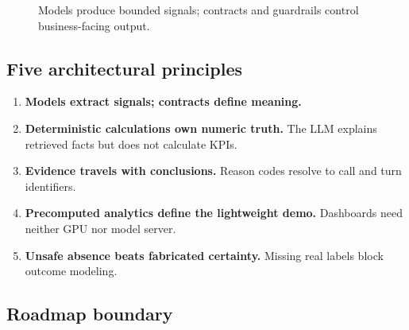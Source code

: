 \documentclass[11pt,letterpaper]{article}
\newenvironment{compactenum}{\begin{enumerate}\setlength{\itemsep}{2pt}\setlength{\parskip}{0pt}\setlength{\topsep}{3pt}}{\end{enumerate}}
\begin{document}
\begin{figure}[ht]
\centering
{}
\caption{Models produce bounded signals; contracts and guardrails control business-facing output.}
\end{figure}

\subsection{Five architectural principles}

\begin{compactenum}
  \item \textbf{Models extract signals; contracts define meaning.}
  \item \textbf{Deterministic calculations own numeric truth.} The LLM explains
  retrieved facts but does not calculate KPIs.
  \item \textbf{Evidence travels with conclusions.} Reason codes resolve to call and
  turn identifiers.
  \item \textbf{Precomputed analytics define the lightweight demo.} Dashboards need
  neither GPU nor model server.
  \item \textbf{Unsafe absence beats fabricated certainty.} Missing real labels block
  outcome modeling.
\end{compactenum}

\subsection{Roadmap boundary}
\end{document}
